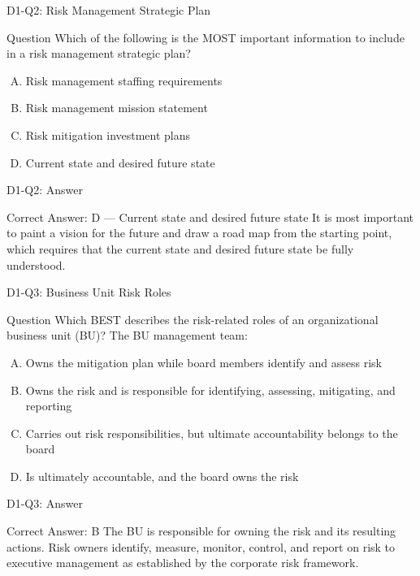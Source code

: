 \documentclass{beamer}
\begin{document}
	\begin{frame}{D1-Q2: Risk Management Strategic Plan}
		\begin{block}{Question}
			Which of the following is the MOST important information to include in a risk management strategic plan?
		\end{block}
		\begin{enumerate}[(A)]
			\item Risk management staffing requirements
			\item Risk management mission statement
			\item Risk mitigation investment plans
			\item Current state and desired future state
		\end{enumerate}
	\end{frame}
	\begin{frame}{D1-Q2: Answer}
		\begin{block}{Correct Answer: D --- Current state and desired future state}
			It is most important to paint a vision for the future and draw a road map from the starting point, which requires that the current state and desired future state be fully understood.
		\end{block}
	\end{frame}
	
	\begin{frame}{D1-Q3: Business Unit Risk Roles}
		\begin{block}{Question}
			Which BEST describes the risk-related roles of an organizational business unit (BU)? The BU management team:
		\end{block}
		\begin{enumerate}[(A)]
			\item Owns the mitigation plan while board members identify and assess risk
			\item Owns the risk and is responsible for identifying, assessing, mitigating, and reporting
			\item Carries out risk responsibilities, but ultimate accountability belongs to the board
			\item Is ultimately accountable, and the board owns the risk
		\end{enumerate}
	\end{frame}
	\begin{frame}{D1-Q3: Answer}
		\begin{block}{Correct Answer: B}
			The BU is responsible for owning the risk and its resulting actions. Risk owners identify, measure, monitor, control, and report on risk to executive management as established by the corporate risk framework.
		\end{block}
	\end{frame}
	
\end{document}
